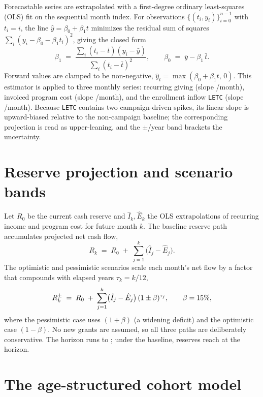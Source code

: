Forecastable series are extrapolated with a first-degree ordinary least-squares
(OLS) fit on the sequential month index. For observations $\{(t_i, y_i)\}_{i=0}^{n-1}$
with $t_i = i$, the line $\hat{y} = \beta_0 + \beta_1 t$ minimizes the residual sum
of squares $\sum_i (y_i - \beta_0 - \beta_1 t_i)^2$, giving the closed form
\begin{equation}
\beta_1 \;=\; \frac{\sum_i (t_i-\bar{t})(y_i-\bar{y})}{\sum_i (t_i-\bar{t})^2},
\qquad
\beta_0 \;=\; \bar{y} - \beta_1\,\bar{t}.
\end{equation}
Forward values are clamped to be non-negative, $\hat{y}_t = \max(\beta_0 + \beta_1 t,\,0)$.
This estimator is applied to three monthly series: recurring giving (slope
\ilsaRecurringSlope{}/month), invoiced program cost (slope \ilsaProgramSlope{}/month),
and the enrollment inflow \texttt{LETC} (slope \ilsaCohortLetcSlope{}/month). Because
\texttt{LETC} contains two campaign-driven spikes, its linear slope is upward-biased
relative to the non-campaign baseline; the corresponding projection is read as
upper-leaning, and the $\pm$\ilsaScenBand{}/year band brackets the uncertainty.

\section{Reserve projection and scenario bands}

Let $R_0$ be the current cash reserve and $\hat{I}_k,\hat{E}_k$ the OLS
extrapolations of recurring income and program cost for future month $k$. The
baseline reserve path accumulates projected net cash flow,
\begin{equation}
R_k \;=\; R_0 \;+\; \sum_{j=1}^{k} \bigl(\hat{I}_j - \hat{E}_j\bigr).
\end{equation}
The optimistic and pessimistic scenarios scale each month's net flow by a factor
that compounds with elapsed years $\tau_k = k/12$,
\begin{equation}
R_k^{\pm} \;=\; R_0 \;+\; \sum_{j=1}^{k} \bigl(\hat{I}_j - \hat{E}_j\bigr)\,(1 \pm \beta)^{\tau_j},
\qquad \beta = 15\%{},
\end{equation}
where the pessimistic case uses $(1+\beta)$ (a widening deficit) and the optimistic
case $(1-\beta)$. No new grants are assumed, so all three paths are deliberately
conservative. The horizon runs to \ilsaScenEnd{}; under the baseline, reserves
reach \ilsaProjCashEnd{} at the horizon.

\section{The age-structured cohort model}

